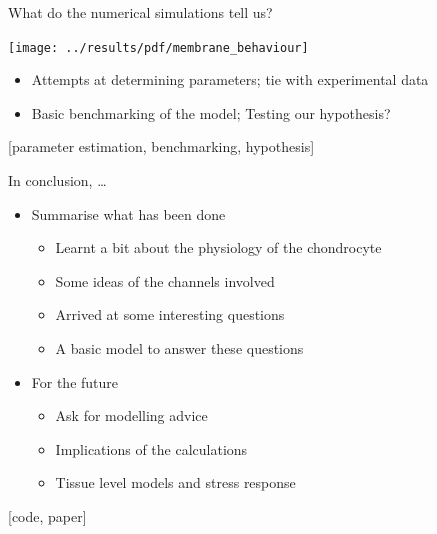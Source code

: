 \documentclass[ignorenonframetext]{beamer}
\newcommand{\references}[1] {
  \begin{flushright}
    \scriptsize [#1] \normalsize
  \end{flushright}
}
\begin{document}
%

\begin{frame}{What do the numerical simulations tell us?}

  \texttt{[image: ../results/pdf/membrane\_behaviour]}

  \begin{itemize}
  \item Attempts at determining parameters; tie with experimental data
  \item Basic benchmarking of the model; Testing our hypothesis?
  \end{itemize}

  \references{parameter estimation, benchmarking, hypothesis}

\end{frame}


\begin{frame}{In conclusion, \ldots}

  \begin{itemize}
  \item Summarise what has been done
    \begin{itemize}
      \item Learnt a bit about the physiology of the chondrocyte
      \item Some ideas of the channels involved
      \item Arrived at some interesting questions
      \item A basic model to answer these questions
    \end{itemize}
  \item For the future
    \begin{itemize}
    \item Ask for modelling advice
    \item Implications of the calculations
    \item Tissue level models and stress response
    \end{itemize}
  \end{itemize}

  \references{code, paper}

\end{frame}
\end{document}
